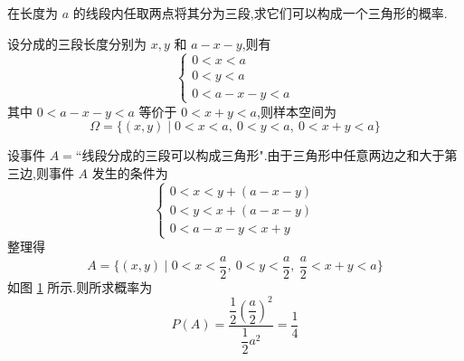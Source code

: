 \question 在长度为 $a$ 的线段内任取两点将其分为三段,求它们可以构成一个三角形的概率.

\begin{solution}
    设分成的三段长度分别为 $x, y$ 和 $a-x-y$,则有
    $$
    \begin{cases}
        0<x<a \\
        0<y<a \\
        0 < a-x-y < a
    \end{cases}
    $$
    其中 $0 < a-x-y < a$ 等价于 $0 < x+y < a$,则样本空间为
    $$
    \varOmega = \{ (x,y) \mid 0<x<a,\ 0<y<a,\ 0 < x+y < a \}
    $$

    设事件 $A = \text{``线段分成的三段可以构成三角形"}$.由于三角形中任意两边之和大于第三边,则事件 $A$ 发生的条件为
    $$
    \begin{cases}
        0 < x < y + (a-x-y) \\
        0 < y < x + (a-x-y) \\
        0 < a-x-y < x+y
    \end{cases}
    $$
    整理得
    $$
    A = \{ (x,y) \mid 0 < x < \dfrac{a}{2},\ 0 < y < \dfrac{a}{2},\ \dfrac{a}{2} < x+y < a \}
    $$
    如图 \ref{fig:example-三角形} 所示.则所求概率为
    $$
    P(A) = \dfrac{\dfrac{1}{2} \left( \dfrac{a}{2} \right)^2}{\dfrac{1}{2} a^2} = \dfrac{1}{4}
    $$

    \begin{figure}[H]
        \centering

        
        \caption{}
        \label{fig:example-三角形}
    \end{figure}
\end{solution}